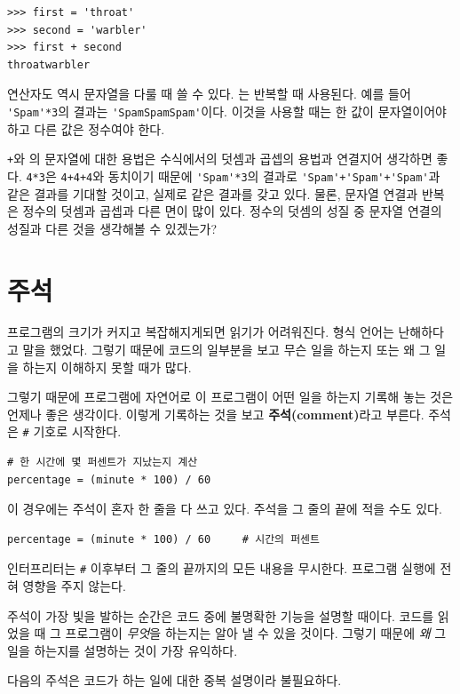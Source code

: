 \documentclass[10pt]{book}
\begin{document}
\begin{verbatim}
>>> first = 'throat'
>>> second = 'warbler'
>>> first + second
throatwarbler
\end{verbatim}
%
{\tt *} 연산자도 역시 문자열을 다룰 때 쓸 수 있다. {\tt *}는 반복할 때
사용된다.  예를 들어 \verb"'Spam'*3"의 결과는
\verb"'SpamSpamSpam'"이다.  이것을 사용할 때는 한 값이 문자열이어야
하고 다른 값은 정수여야 한다.

{\tt +}와 {\tt *}의 문자열에 대한 용법은 수식에서의 덧셈과 곱셉의
용법과 연결지어 생각하면 좋다.  {\tt 4*3}은 {\tt 4+4+4}와 동치이기
때문에 \verb"'Spam'*3"의 결과로 \verb"'Spam'+'Spam'+'Spam'"과 같은
결과를 기대할 것이고, 실제로 같은 결과를 갖고 있다.  물론, 문자열
연결과 반복은 정수의 덧셈과 곱셉과 다른 면이 많이 있다.  정수의 덧셈의
성질 중 문자열 연결의 성질과 다른 것을 생각해볼 수 있겠는가?


\section{주석}


프로그램의 크기가 커지고 복잡해지게되면 읽기가 어려워진다.  형식 언어는
난해하다고 말을 했었다. 그렇기 때문에 코드의 일부분을 보고 무슨 일을
하는지 또는 왜 그 일을 하는지 이해하지 못할 때가 많다.


그렇기 때문에 프로그램에 자연어로 이 프로그램이 어떤 일을 하는지 기록해
놓는 것은 언제나 좋은 생각이다.  이렇게 기록하는 것을 보고 {\bf
  주석(comment)}라고 부른다.  주석은 \verb"#" 기호로 시작한다.

\begin{verbatim}
# 한 시간에 몇 퍼센트가 지났는지 계산
percentage = (minute * 100) / 60
\end{verbatim}
%
이 경우에는 주석이 혼자 한 줄을 다 쓰고 있다.  주석을 그 줄의 끝에
적을 수도 있다.

\begin{verbatim}
percentage = (minute * 100) / 60     # 시간의 퍼센트
\end{verbatim}
%
인터프리터는 {\tt \#} 이후부터 그 줄의 끝까지의 모든 내용을 무시한다.
프로그램 실행에 전혀 영향을 주지 않는다.

주석이 가장 빛을 발하는 순간은 코드 중에 불명확한 기능을 설명할 때이다.  코드를 읽었을 때 그 프로그램이 {\em 무엇}을 하는지는 알아 낼 수 있을 것이다.  그렇기 때문에 {\em 왜} 그 일을 하는지를 설명하는 것이 가장 유익하다. 

다음의 주석은 코드가 하는 일에 대한 중복 설명이라 불필요하다. 
\end{document}
